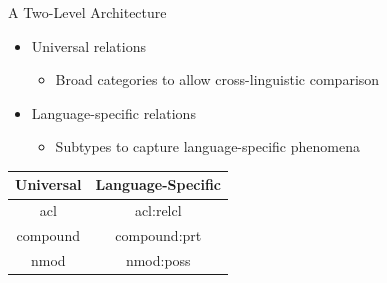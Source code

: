 \documentclass[10pt, compress, aspectratio=169]{beamer}
\begin{document}
\begin{frame}{A Two-Level Architecture}
\begin{itemize}
\item Universal relations
\begin{itemize}
\item Broad categories to allow cross-linguistic comparison
\end{itemize}
\item Language-specific relations
\begin{itemize}
\item Subtypes to capture language-specific phenomena
\end{itemize}
\end{itemize}

\centering
\bigskip
\begin{tabular}{|c|c|}
\hline
\textbf{Universal} & \textbf{Language-Specific} \\
\hline
acl & acl:relcl \\
compound & compound:prt \\
nmod & nmod:poss \\
\hline
\end{tabular}

\end{frame}
\end{document}
